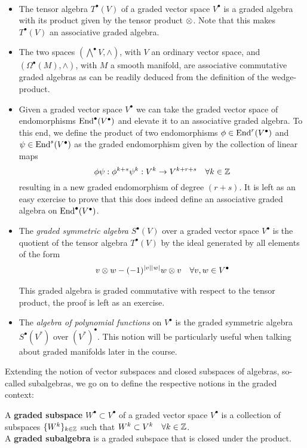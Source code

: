 \begin{example}~
\begin{itemize}
  \item The tensor algebra $T^\bullet(V)$ of a graded vector space $V^\bullet$ is a graded algebra with its product given by the tensor product $\mathbin{\mathop{\otimes}\displaylimits_{}}$. Note that this makes $T^\bullet(V)$ an associative graded algebra.

  \item The two spaces $(\bigwedge^\bullet V, \wedge)$, with $V$ an ordinary vector space, and $(\Omega^\bullet(M), \wedge)$, with $M$ a smooth manifold, are associative commutative graded algebras as can be readily deduced from the definition of the wedge-product. 

  \item Given a graded vector space $V^\bullet$ we can take the graded vector space of endomorphisms $\operatorname{End}^\bullet(V^\bullet)$  and elevate it to an associative graded algebra. To this end, we define the product of two endomorphisms $\phi \in \End^r(V^\bullet)$ and $\psi \in \operatorname{End}^s(V^\bullet)$ as the graded endomorphism given by the collection of linear maps
  $$ \phi \psi : \phi^{k+s}\psi^k: V^k \ra V^{k+r+s}\quad \forall k\in \ZZ $$
  resulting in a new graded endomorphism of degree $(r+s)$. It is left as an easy exercise to prove that this does indeed define an associative graded algebra on $\operatorname{End}^\bullet(V^\bullet)$.

  \item The \emph{graded symmetric algebra} $S^\bullet(V)$ over a graded vector space $V^\bullet$ is the quotient of the tensor algebra $T^\bullet(V)$ by the ideal generated by all elements of the form
  $$ v\mathbin{\mathop{\otimes}\displaylimits_{}}w - (-1)^{|v||w|} w \mathbin{\mathop{\otimes}\displaylimits_{}}v \quad \forall v,w \in V^\bullet $$
  This graded algebra is graded commutative with respect to the tensor product, the proof is left as an exercise.

 \item The \emph{algebra of polynomial functions} on $V^\bullet$ is the graded symmetric algebra $S^\bullet(V^*)$ over $(V^*)^\bullet$. This notion will be particularly useful when talking about graded manifolds later in the course.
\end{itemize}
\end{example}

Extending the notion of vector subspaces and closed subspaces of algebras, so-called subalgebras, we go on to define the respective notions in the graded context:

\begin{definition}
  A \textbf{graded subspace} $W^\bullet \subset V^\bullet$ of a graded vector space $V^\bullet$ is a collection of subspaces $\{ W^k \}_{k\in\mathbb{Z}}$ such that $W^k \subset V^k \quad \forall k \in \mathbb{Z}$.\\
  A \textbf{graded subalgebra} is a graded subspace that is closed under the product.
\end{definition}

